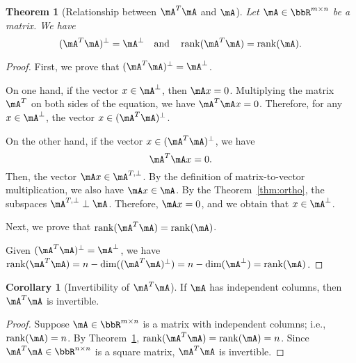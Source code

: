 \documentclass[11pt]{article}
\DeclareMathOperator{\rank}{rank}
\theoremstyle{plain}
\newtheorem{thm}{Theorem}[section]
\theoremstyle{definition}
\newtheorem{cor}{Corollary}
\begin{document}
\begin{thm}[Relationship between $\mA^T \mA$ and $\mA$]\label{thm:aa}Let $\mA \in \bbR^{m \times n}$ be a matrix. We have
	\begin{equation}
		(\mA^T \mA)^{\perp} = \mA^{\perp} \quad \text{and} \quad \rank(\mA^T \mA) = \rank(\mA).
	\end{equation}
\end{thm}
\begin{proof}
	First, we prove that $(\mA^T \mA)^{\perp} = \mA^{\perp}$.
	
	On one hand, if the vector $x \in \mA^{\perp}$, then $\mA x = 0$. Multiplying the matrix $\mA^T$ on both sides of the equation, we have $ \mA^T  \mA x = 0$. Therefore, for any $x \in \mA^{\perp}$, the vector $x \in (\mA^T \mA)^{\perp}$. 
	\iffalse
	
	On the other hand, we  prove  by contradiction that for any $x \in (\mA^T \mA)^{\perp}$ the vector $x \in \mA^{\perp}$.
	
	Suppose there is a vector $x \in (\mA^T \mA^T)^{\perp}$ but $x \notin \mA^{\perp}$. We have
	\begin{equation}\label{eq:aaa}
		\mA x = b \neq 0, \quad \mA^T \mA x = 0 \quad \Rightarrow \quad \mA^T b = 0.
	\end{equation} 
	By the first equality in \eqref{eq:aaa}, $b \in \mA$, and by the third equation in \eqref{eq:aaa}, $ b \in \mA^{T,\perp}$. This contradicts the Theorem~\ref{thm:ortho} that $\mA \perp \mA^{T,\perp}$. Therefore, for any $x \in (\mA^T \mA)^{\perp}$, the vector $x \in \mA^{\perp}$.
	
	\fi
	
	On the other hand, if the vector $x \in (\mA^T \mA)^{\perp}$, we have
	\[ \mA^T \mA x = 0.\]
	Then, the vector $\mA x \in  \mA^{T,\perp}$. By the definition of matrix-to-vector multiplication, we also have $\mA x \in \mA$.  By the Theorem~\ref{thm:ortho}, the subspaces $\mA^{T,\perp} \perp \mA$. Therefore, $\mA x = 0$, and we obtain that $x \in \mA^{\perp}$.
	\vspace{0.2cm}
	
	Next, we prove that $\rank(\mA^T \mA) = \rank(\mA)$. 
	
	Given $(\mA^T \mA)^{\perp} = \mA^{\perp}$, we have $\rank(\mA^T \mA) = n - \dim((\mA^T \mA)^{\perp}) = n - \dim(\mA^{\perp}) = \rank(\mA)$.
\end{proof}

\begin{cor}[Invertibility of $\mA^T \mA$]\label{cor:invert}
	If $\mA$ has independent columns, then $\mA^T \mA$ is invertible.
\end{cor}
\begin{proof}
Suppose $\mA \in \bbR^{m \times n}$ is a matrix with independent columns; i.e., $\rank(\mA) = n$. By Theorem~\ref{thm:aa}, $\rank(\mA^T \mA) = \rank(\mA) = n$. Since $\mA^T \mA \in \bbR^{n \times n}$ is a square matrix, $\mA^T \mA$ is invertible.
\end{proof}
\end{document}
